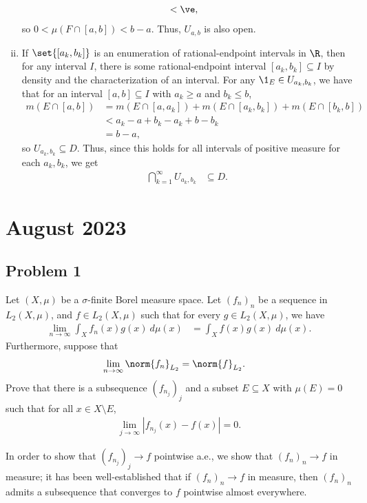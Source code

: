 \documentclass[10pt]{mypackage}
\begin{document}
\begin{enumerate}[(i)]
\begin{align*}
                                                                                           &< \ve,
    \end{align*}
    so $0 < \mu\left( F\cap [a,b] \right) < b-a$. Thus, $U_{a,b}$ is also open.
  \item If $\set{\left[ a_k,b_k \right]}$ is an enumeration of rational-endpoint intervals in $\R$, then for any interval $I$, there is some rational-endpoint interval $\left[a_k,b_k\right]\subseteq I$ by density and the characterization of an interval. For any $\1_{E}\in U_{a_k,b_k}$, we have that for an interval $[a,b]\subseteq I$ with $a_k\geq a$ and $b_k \leq b$,
    \begin{align*}
      m\left( E\cap [a,b] \right) &= m\left( E\cap \left[ a,a_k \right] \right) + m\left( E\cap \left[ a_k,b_k \right] \right) + m\left(E\cap  \left[ b_k,b \right] \right)\\
                                  &< a_k-a + b_k-a_k + b-b_k\\
                                  &= b-a,
    \end{align*}
    so $U_{a_k,b_k}\subseteq D$. Thus, since this holds for all intervals of positive measure for each $a_k,b_k$, we get
    \begin{align*}
      \bigcap_{k=1}^{\infty}U_{a_k,b_k} &\subseteq D.
    \end{align*}
\end{enumerate}
\section{August 2023}%
\subsection{Problem 1}%
\begin{problem}
Let $\left( X,\mu \right)$ be a $\sigma$-finite Borel measure space. Let $\left( f_n \right)_n$ be a sequence in $L_2\left( X,\mu \right)$, and $f\in L_2\left( X,\mu \right)$ such that for every $g\in L_2\left( X,\mu \right)$, we have
\begin{align*}
  \lim_{n\rightarrow\infty} \int_{X}^{} f_n(x)g(x)\:d\mu(x) &= \int_{X}^{} f(x)g(x)\:d\mu(x).
\end{align*}
Furthermore, suppose that
\begin{align*}
  \lim_{n\rightarrow\infty}\norm{f_n}_{L_2} &= \norm{f}_{L_2}.
\end{align*}
Prove that there is a subsequence $\left( f_{n_j} \right)_j$ and a subset $E\subseteq X$ with $\mu\left( E \right) = 0$ such that for all $x\in X\setminus E$,
\begin{align*}
  \lim_{j\rightarrow\infty} \left\vert f_{n_j}(x)-f(x) \right\vert = 0.
\end{align*}
\end{problem}
In order to show that $\left( f_{n_j} \right)_j\rightarrow f$ pointwise a.e., we show that $\left( f_{n} \right)_n\rightarrow f$ in measure; it has been well-established that if $\left( f_n \right)_n\rightarrow f$ in measure, then $\left( f_n \right)_n$ admits a subsequence that converges to $f$ pointwise almost everywhere.\newline
\end{document}
